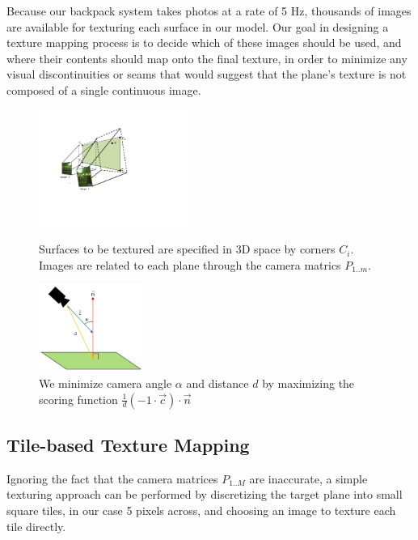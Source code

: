 \documentclass[]{spie}  %
\begin{document}
Because our backpack system takes photos at a rate of 5 Hz, thousands
of images are available for texturing each surface in our model. Our
goal in designing a texture mapping process is to decide which of
these images should be used, and where their contents should map onto
the final texture, in order to minimize any visual discontinuities or
seams that would suggest that the plane's texture is not composed of a
single continuous image.

\begin{figure}
  \begin{minipage}[b]{0.45\linewidth}
    \centering
    \includegraphics[height=1.5in]{Projection.pdf}
    \caption{Surfaces to be textured are specified in 3D space by
      corners $C_i$. Images are related to each plane through the
      camera matrics $P_{1..m}$. }
    \label{fig:projection}
  \end{minipage}
  \hspace{0.5cm}
  \begin{minipage}[b]{0.45\linewidth}
    \centering
    \includegraphics[height=1.125in]{scoringFunction.jpg}
    \caption{We minimize camera angle $\alpha$ and distance $d$ by
      maximizing the scoring function $\frac{1}{d} (-1 \cdot \vec{c})
      \cdot \vec{n}$}
    \label{fig:scoringFunction}
  \end{minipage}
\end{figure}


\subsection{Tile-based Texture Mapping}
\label{sec:tileBasedMapping}
Ignoring the fact that the camera matrices $P_{1..M}$ are inaccurate,
a simple texturing approach can be performed by discretizing the
target plane into small square tiles, in our case 5 pixels across, and
choosing an image to texture each tile directly.
\end{document}
